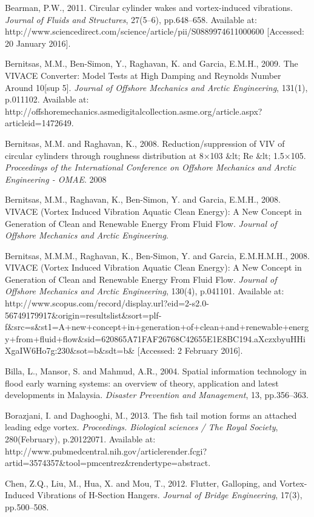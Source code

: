 \documentclass[]{article}
\begin{document}
Bearman, P.W., 2011. Circular cylinder wakes and vortex-induced
vibrations. \emph{Journal of Fluids and Structures}, 27(5--6),
pp.648--658. Available at:
http://www.sciencedirect.com/science/article/pii/S0889974611000600
{[}Accessed: 20 January 2016{]}.

Bernitsas, M.M., Ben-Simon, Y., Raghavan, K. and Garcia, E.M.H., 2009.
The VIVACE Converter: Model Tests at High Damping and Reynolds Number
Around 10{[}sup 5{]}. \emph{Journal of Offshore Mechanics and Arctic
Engineering}, 131(1), p.011102. Available at:
http://offshoremechanics.asmedigitalcollection.asme.org/article.aspx?articleid=1472649.

Bernitsas, M.M. and Raghavan, K., 2008. Reduction/suppression of VIV of
circular cylinders through roughness distribution at 8×103 \&lt; Re
\&lt; 1.5×105. \emph{Proceedings of the International Conference on
Offshore Mechanics and Arctic Engineering - OMAE}. 2008

Bernitsas, M.M., Raghavan, K., Ben-Simon, Y. and Garcia, E.M.H., 2008.
VIVACE (Vortex Induced Vibration Aquatic Clean Energy): A New Concept in
Generation of Clean and Renewable Energy From Fluid Flow. \emph{Journal
of Offshore Mechanics and Arctic Engineering}.

Bernitsas, M.M.M., Raghavan, K., Ben-Simon, Y. and Garcia, E.M.H.M.H.,
2008. VIVACE (Vortex Induced Vibration Aquatic Clean Energy): A New
Concept in Generation of Clean and Renewable Energy From Fluid Flow.
\emph{Journal of Offshore Mechanics and Arctic Engineering}, 130(4),
p.041101. Available at:
http://www.scopus.com/record/display.url?eid=2-s2.0-56749179917\&origin=resultslist\&sort=plf-f\&src=s\&st1=A+new+concept+in+generation+of+clean+and+renewable+energy+from+fluid+flow\&sid=620865A71FAF26768C42655E1E8BC194.aXczxbyuHHiXgaIW6Ho7g:230\&sot=b\&sdt=b\&
{[}Accessed: 2 February 2016{]}.

Billa, L., Mansor, S. and Mahmud, A.R., 2004. Spatial information
technology in flood early warning systems: an overview of theory,
application and latest developments in Malaysia. \emph{Disaster
Prevention and Management}, 13, pp.356--363.

Borazjani, I. and Daghooghi, M., 2013. The fish tail motion forms an
attached leading edge vortex. \emph{Proceedings. Biological sciences /
The Royal Society}, 280(February), p.20122071. Available at:
http://www.pubmedcentral.nih.gov/articlerender.fcgi?artid=3574357\&tool=pmcentrez\&rendertype=abstract.

Chen, Z.Q., Liu, M., Hua, X. and Mou, T., 2012. Flutter, Galloping, and
Vortex-Induced Vibrations of H-Section Hangers. \emph{Journal of Bridge
Engineering}, 17(3), pp.500--508.
\end{document}
